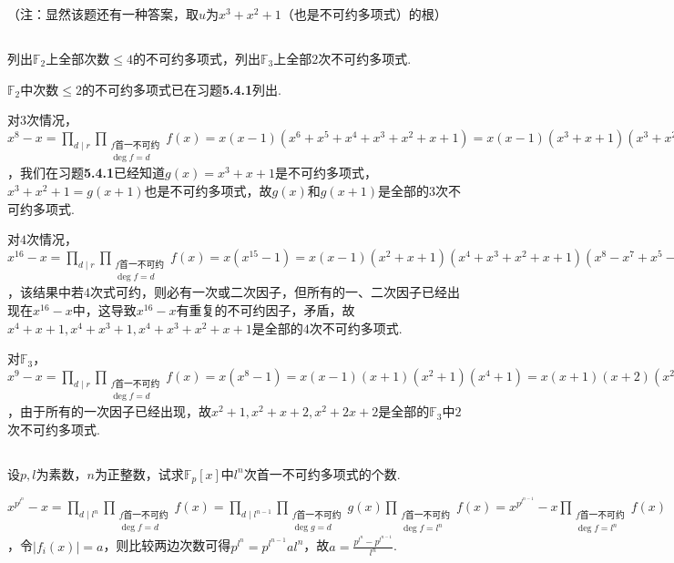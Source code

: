 （注：显然该题还有一种答案，取$u$为$x^3+x^2+1$（也是不可约多项式）的根）

\subsection{}
列出$\mathbb{F}_2$上全部次数$\leq 4$的不可约多项式，列出$\mathbb{F}_3$上全部$2$次不可约多项式.

\jie $\mathbb{F}_2$中次数$\leq 2$的不可约多项式已在{\heiti 习题}\textbf{5.4.1}列出.

对$3$次情况，$x^8-x=\prod_{d\mid r}\prod_{\substack{f\text{首一不可约}\\\deg f=d}}f(x)=x(x-1)(x^6+x^5+x^4+x^3+x^2+x+1)
=x(x-1)(x^3+x+1)(x^3+x^2+1)$，我们在{\heiti 习题}\textbf{5.4.1}已经知道$g(x)=x^3+x+1$是不可约多项式，$x^3+x^2+1=g(x+1)$也是不可约多项式，故$g(x)$和$g(x+1)$是全部的$3$次不可约多项式.

对$4$次情况，$x^16-x=\prod_{d\mid r}\prod_{\substack{f\text{首一不可约}\\\deg f=d}}f(x)=x(x^15-1)=x(x-1)(x^2+x+1)(x^4+x^3+x^2+x+1)(x^8-x^7+x^5-x^4+x^3-x+1)
=x(x-1)(x^2+x+1)(x^4+x+1)(x^4+x^3+1)(x^4+x^3+x^2+x+1)$，该结果中若$4$次式可约，则必有一次或二次因子，但所有的一、二次因子已经出现在$x^16-x$中，这导致$x^16-x$有重复的不可约因子，矛盾，故$x^4+x+1,x^4+x^3+1,x^4+x^3+x^2+x+1$是全部的$4$次不可约多项式.

对$\mathbb{F}_3$，$x^9-x=\prod_{d\mid r}\prod_{\substack{f\text{首一不可约}\\\deg f=d}}f(x)=x(x^8-1)=x(x-1)(x+1)(x^2+1)(x^4+1)
=x(x+1)(x+2)(x^2+1)(x^2+x+2)(x^2+2x+2)$，由于所有的一次因子已经出现，故$x^2+1,x^2+x+2,x^2+2x+2$是全部的$\mathbb{F}_3$中$2$次不可约多项式.

\subsection{}
设$p,l$为素数，$n$为正整数，试求$\mathbb{F}_p[x]$中$l^n$次首一不可约多项式的个数.

\jie $x^{p^{l^n}}-x=\prod_{d\mid l^n}\prod_{\substack{f\text{首一不可约}\\\deg f=d}}f(x)=\prod_{d\mid l^{n-1}}\prod_{\substack{f\text{首一不可约}\\\deg g=d}}g(x)\prod_{\substack{f\text{首一不可约}\\\deg f=l^n}}f(x)=x^{p^{l^{n-1}}}-x\prod_{\substack{f\text{首一不可约}\\\deg f=l^n}}f(x)$，令$|f_i(x)|=a$，则比较两边次数可得$p^{l^n}=p^{l^{n-1}}al^n$，故$a=\frac{p^{l^n}-p^{l^{n-1}}}{l^n}$.


